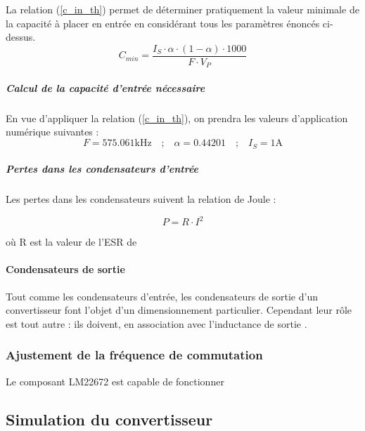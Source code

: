 						La relation (\ref{c_in_th}) permet de déterminer pratiquement la valeur minimale de la capacité à placer en entrée en considérant tous les paramètres énoncés ci-dessus.
						\begin{equation}
							C_{min} = \frac{I_S\cdot\alpha\cdot(1-\alpha)\cdot 1000}{F\cdot V_P}
							\label{c_in_th}
						\end{equation}
						
						\subparagraph{Calcul de la capacité d'entrée nécessaire}
						
						En vue d'appliquer la relation (\ref{c_in_th}), on prendra les valeurs d'application numérique suivantes :		
						\begin{equation}
							F = 575.061\text{kHz} 
							\quad\text{;}\quad
							\alpha = 0.44201
							\quad\text{;}\quad
							I_S = 1\text{A}
						\end{equation}
						
						\subparagraph{Pertes dans les condensateurs d'entrée}
						
						Les pertes dans les condensateurs suivent la relation de Joule :
						
						\begin{equation}
							P = R \cdot I^2
						\end{equation}
						
						où R est la valeur de l'ESR de
						
								
							\paragraph{Condensateurs de sortie}
							
							Tout comme les condensateurs d'entrée, les condensateurs de sortie d'un convertisseur font l'objet d'un dimensionnement particulier. Cependant leur rôle est tout autre : ils doivent, en association avec l'inductance de sortie \cite{A055}.	
				
				
			
			\subsubsection{Ajustement de la fréquence de commutation}
			
			Le composant LM22672 est capable de fonctionner 
			
			\subsection{Simulation du convertisseur}
			
